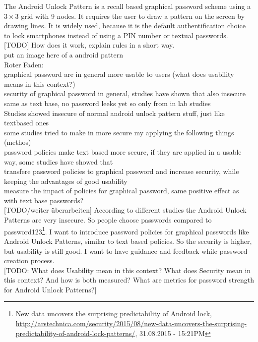 \documentclass[twocolumn, a4paper, 10pt]{article}
\begin{document}
The Android Unlock Pattern is a recall based graphical password scheme using a $3\times3$ grid with 9 nodes. It requires the user to draw a pattern on the screen by drawing lines. It is widely used, because it is the default authentification choice to lock smartphones instead of using a PIN number or textual passwords.\\

[TODO] How does it work, explain rules in a short way.\\
[TODO/img] put an image here of a android pattern\\

Roter Faden:\\
graphical password are in general more usable to users (what does usability means in this context?)\\
security of graphical password in general, studies have shown that also insecure same as text base, no password leeks yet so only from in lab studies\\
Studies showed insecure of normal android unlock pattern stuff, just like textbased ones\\
some studies tried to make in more secure my applying the following things (methos)\\
password policies make text based more secure, if they are applied in a usable way, some studies have showed that\\
transfere password policies to graphical password and increase security, while keeping the advantages of good usability\\
measure the impact of policies for graphical password, same positive effect as with text base passwords?\\

[TODO/weiter überarbeiten]
According to different studies the Android Unlock Patterns are very insecure. So people choose passwords compared to password123\footnote{New data uncovers the surprising predictability of Android lock, \url{http://arstechnica.com/security/2015/08/new-data-uncovers-the-surprising-predictability-of-android-lock-patterns/}, 31.08.2015 - 15:21PM}. I want to introduce password policies for  graphical passwords like Android Unlock Patterns, similar to text based policies. So the security is higher, but usability is still good. I want to have guidance and feedback while password creation process.\\

[TODO: What does Usability mean in this context? What does Security mean in this context? And how is both measured? What are metrics for password strength for Android Unlock Patterns?]\\
\end{document}
